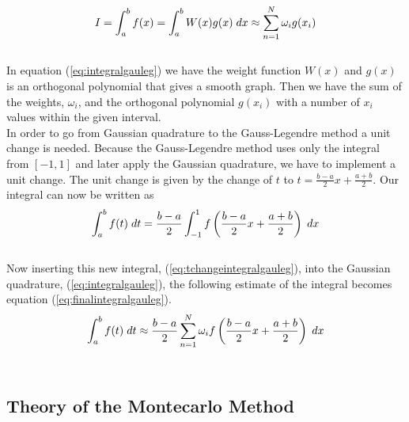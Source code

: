 \documentclass{article}
\begin{document}
\begin{equation} \label{eq:integralgauleg}
    I = \int_{a}^{b} f(x) = \int_{a}^{b}W(x)g(x) \hspace{1mm} dx \approx  \sum_{n=1}^{N}  \omega_i g(x_i)
\end{equation} \\

In equation (\ref{eq:integralgauleg}) we have the weight function $W(x)$ and $g(x)$ is an orthogonal polynomial that gives a smooth graph. Then we have the sum of the weights, $\omega_i$, and the orthogonal polynomial $g(x_i)$ with a number of $x_i$ values within the given interval. \\

In order to go from Gaussian quadrature to the Gauss-Legendre method a unit change is needed. Because the Gauss-Legendre method uses only the integral from $[-1,1]$ and later apply the Gaussian quadrature, we have to implement a unit change. The unit change is given by the change of $t$ to $t = \frac{b-a}{2}x + \frac{a+b}{2}$. Our integral can now be written as \\

\begin{equation} \label{eq:tchangeintegralgauleg}
    \int_{a}^{b} f(t) \hspace{1mm} dt = \frac{b-a}{2}\int_{-1}^{1} f \left( \frac{b-a}{2}x + \frac{a+b}{2} \right) \hspace{1mm} dx
\end{equation} \\

Now inserting this new integral, (\ref{eq:tchangeintegralgauleg}), into the Gaussian quadrature, (\ref{eq:integralgauleg}), the following estimate of the integral becomes equation (\ref{eq:finalintegralgauleg}). \\

\begin{equation} \label{eq:finalintegralgauleg}
    \int_{a}^{b} f(t) \hspace{1mm} dt \approx \frac{b-a}{2} \sum_{n=1}^{N} \omega_i f \left( \frac{b-a}{2}x + \frac{a+b}{2} \right) \hspace{1mm} dx
\end{equation} \\

\subsection{Theory of the Montecarlo Method}
\end{document}
